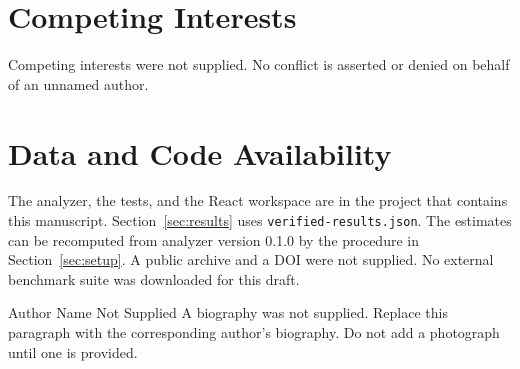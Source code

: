 \documentclass{ieeeaccess}
\begin{document}
\section*{Competing Interests}
Competing interests were not supplied.
No conflict is asserted or denied on behalf of an unnamed author.

\section*{Data and Code Availability}
The analyzer, the tests, and the React workspace are in the project that contains this manuscript.
Section~\ref{sec:results} uses \texttt{verified-\allowbreak results.json}.
The estimates can be recomputed from analyzer version 0.1.0 by the procedure in Section~\ref{sec:setup}.
A public archive and a DOI were not supplied.
No external benchmark suite was downloaded for this draft.




\EOD

\begin{IEEEbiographynophoto}{Author Name Not Supplied}
A biography was not supplied.
Replace this paragraph with the corresponding author's biography.
Do not add a photograph until one is provided.
\end{IEEEbiographynophoto}
\end{document}
